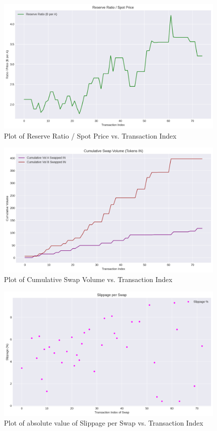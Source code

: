 \documentclass[12pt]{article}
\begin{document}
\begin{figure}[H]
    \centering
    \includegraphics[width=\textwidth]{../task2_plots/reserve_ratio_spot_price.png}
    \caption{Plot of Reserve Ratio / Spot Price vs. Transaction Index}
    \label{fig:ratio}
\end{figure}

\begin{figure}[H]
    \centering
    \includegraphics[width=\textwidth]{../task2_plots/swap_volume.png}
    \caption{Plot of Cumulative Swap Volume vs. Transaction Index}
    \label{fig:volume}
\end{figure}

\begin{figure}[H]
    \centering
    \includegraphics[width=\textwidth]{../task2_plots/slippage.png}
    \caption{Plot of absolute value of Slippage per Swap vs. Transaction Index}
    \label{fig:slippage}
\end{figure}
\end{document}

